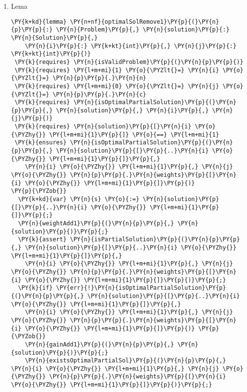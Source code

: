 \begin{sloppypar}
\begin{enumerate}
\begin{Verbatim}[commandchars=\\\{\}]
    \PY{k}{assert} \PY{k+kc}{false}\PY{p}{;}
  \PY{p}{\PYZcb{}}
\PY{p}{\PYZcb{}}
\end{Verbatim}
     \item Lema 
     \begin{Verbatim}[commandchars=\\\{\}]
\PY{k+kd}{lemma} \PY{n+nf}{optimalSolRemove1}\PY{p}{(}\PY{n}{p}\PY{p}{:} \PY{n}{Problem}\PY{p}{,} \PY{n}{solution}\PY{p}{:} \PY{n}{Solution}\PY{p}{,} 
    \PY{n}{i}\PY{p}{:} \PY{k+kt}{int}\PY{p}{,} \PY{n}{j}\PY{p}{:} \PY{k+kt}{int}\PY{p}{)}
 \PY{k}{requires} \PY{n}{isValidProblem}\PY{p}{(}\PY{n}{p}\PY{p}{)}
 \PY{k}{requires} \PY{l+m+mi}{1} \PY{o}{\PYZlt{}=} \PY{n}{i} \PY{o}{\PYZlt{}=} \PY{n}{p}\PY{p}{.}\PY{n}{n}
 \PY{k}{requires} \PY{l+m+mi}{0} \PY{o}{\PYZlt{}=} \PY{n}{j} \PY{o}{\PYZlt{}=} \PY{n}{p}\PY{p}{.}\PY{n}{c}
 \PY{k}{requires} \PY{n}{isOptimalPartialSolution}\PY{p}{(}\PY{n}{p}\PY{p}{,} \PY{n}{solution}\PY{p}{,} \PY{n}{i}\PY{p}{,} \PY{n}{j}\PY{p}{)}
 \PY{k}{requires} \PY{n}{solution}\PY{p}{[}\PY{n}{i} \PY{o}{\PYZhy{}} \PY{l+m+mi}{1}\PY{p}{]} \PY{o}{==} \PY{l+m+mi}{1}
 \PY{k}{ensures} \PY{n}{isOptimalPartialSolution}\PY{p}{(}\PY{n}{p}\PY{p}{,} \PY{n}{solution}\PY{p}{[}\PY{p}{..}\PY{n}{i} \PY{o}{\PYZhy{}} \PY{l+m+mi}{1}\PY{p}{]}\PY{p}{,} 
    \PY{n}{i} \PY{o}{\PYZhy{}} \PY{l+m+mi}{1}\PY{p}{,} \PY{n}{j} \PY{o}{\PYZhy{}} \PY{n}{p}\PY{p}{.}\PY{n}{weights}\PY{p}{[}\PY{n}{i} \PY{o}{\PYZhy{}} \PY{l+m+mi}{1}\PY{p}{]}\PY{p}{)}
\PY{p}{\PYZob{}}
  \PY{k+kd}{var} \PY{n}{s} \PY{o}{:=} \PY{n}{solution}\PY{p}{[}\PY{p}{..}\PY{n}{i} \PY{o}{\PYZhy{}} \PY{l+m+mi}{1}\PY{p}{]}\PY{p}{;}
  \PY{n}{weightAdd1}\PY{p}{(}\PY{n}{p}\PY{p}{,} \PY{n}{solution}\PY{p}{)}\PY{p}{;}
  \PY{k}{assert} \PY{n}{isPartialSolution}\PY{p}{(}\PY{n}{p}\PY{p}{,} \PY{n}{solution}\PY{p}{[}\PY{p}{..}\PY{n}{i} \PY{o}{\PYZhy{}} \PY{l+m+mi}{1}\PY{p}{]}\PY{p}{,} 
    \PY{n}{i} \PY{o}{\PYZhy{}} \PY{l+m+mi}{1}\PY{p}{,} \PY{n}{j} \PY{o}{\PYZhy{}} \PY{n}{p}\PY{p}{.}\PY{n}{weights}\PY{p}{[}\PY{n}{i} \PY{o}{\PYZhy{}} \PY{l+m+mi}{1}\PY{p}{]}\PY{p}{)}\PY{p}{;}
  \PY{k}{if} \PY{err}{!}\PY{n}{isOptimalPartialSolution}\PY{p}{(}\PY{n}{p}\PY{p}{,} \PY{n}{solution}\PY{p}{[}\PY{p}{..}\PY{n}{i} \PY{o}{\PYZhy{}} \PY{l+m+mi}{1}\PY{p}{]}\PY{p}{,} 
    \PY{n}{i} \PY{o}{\PYZhy{}} \PY{l+m+mi}{1}\PY{p}{,} \PY{n}{j} \PY{o}{\PYZhy{}} \PY{n}{p}\PY{p}{.}\PY{n}{weights}\PY{p}{[}\PY{n}{i} \PY{o}{\PYZhy{}} \PY{l+m+mi}{1}\PY{p}{]}\PY{p}{)} \PY{p}{\PYZob{}}
    \PY{n}{gainAdd1}\PY{p}{(}\PY{n}{p}\PY{p}{,} \PY{n}{solution}\PY{p}{)}\PY{p}{;}
    \PY{n}{existsOptimalPartialSol}\PY{p}{(}\PY{n}{p}\PY{p}{,} \PY{n}{i} \PY{o}{\PYZhy{}} \PY{l+m+mi}{1}\PY{p}{,} \PY{n}{j} \PY{o}{\PYZhy{}} \PY{n}{p}\PY{p}{.}\PY{n}{weights}\PY{p}{[}\PY{n}{i} \PY{o}{\PYZhy{}} \PY{l+m+mi}{1}\PY{p}{]}\PY{p}{)}\PY{p}{;}

\end{Verbatim}
\end{enumerate}
\end{sloppypar}
